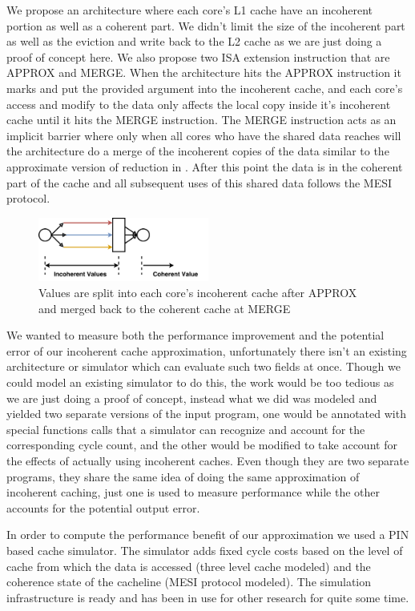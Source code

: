 \documentclass[12pt,conference]{IEEEtran}
\begin{document}
We propose an architecture where each core's L1 cache have an incoherent
portion as well as a coherent part. We didn't limit the size of the 
incoherent part as well as the eviction and write back to the L2 cache as
we are just doing a proof of concept here. We also propose two ISA extension
instruction that are APPROX and MERGE. When the architecture hits the 
APPROX instruction it marks and put the provided argument into the incoherent
cache, and each core's access and modify to the data only affects the local
copy inside it's incoherent cache until it hits the MERGE instruction. The
MERGE instruction acts as an implicit barrier where only when all cores
who have the shared data reaches will the architecture do a merge of the
incoherent copies of the data similar to the approximate version of reduction
in \cite{paraprox}. After this point the data is in the coherent part of the
cache and all subsequent uses of this shared data follows the MESI protocol.
\begin{figure}[h]
    \centering
    \includegraphics[width=0.50\textwidth]{incoherent.pdf}
    \caption{Values are split into each core's incoherent cache after APPROX and merged back to the coherent cache at MERGE}
    \label{fig:incoherent}
\end{figure}

We wanted to measure both the performance improvement and the potential
error of our incoherent cache approximation, unfortunately there isn't
an existing architecture or simulator which can evaluate such two fields at
once. Though we could model an existing simulator to do this, the work
would be too tedious as we are just doing a proof of concept, instead
what we did was modeled and yielded two separate versions of the input
program, one would be annotated with special functions calls that a
simulator can recognize and account for the corresponding cycle count,
and the other would be modified to take account for the effects of
actually using incoherent caches. Even though they are two separate 
programs, they share the same idea of doing the same approximation of
incoherent caching, just one is used to measure performance while the
other accounts for the potential output error.

In order to compute the performance benefit of our approximation
we used a PIN\cite{pin} based cache simulator. The simulator adds 
fixed cycle costs based on the level of cache from which the
data is accessed (three level cache modeled) and the coherence
state of the cacheline (MESI protocol modeled). The simulation
infrastructure is ready and has been in use for other research
for quite some time.
\end{document}
